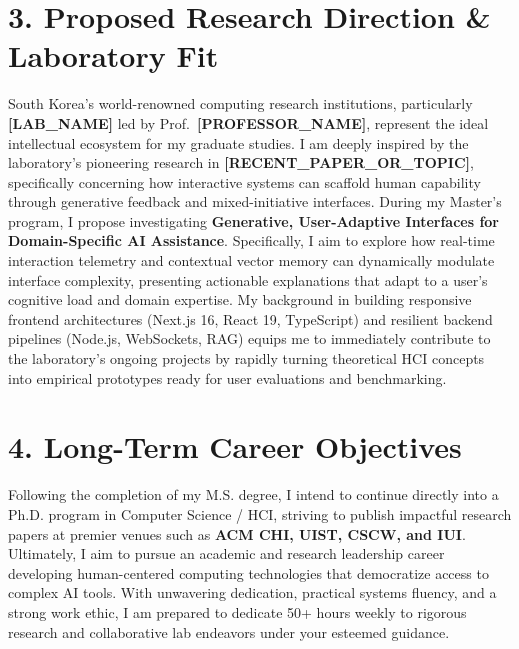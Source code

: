 \documentclass[10pt,a4paper]{article}
\begin{document}
\section{3. Proposed Research Direction \& Laboratory Fit}
South Korea's world-renowned computing research institutions, particularly \textbf{[LAB\_NAME]} led by Prof.~\textbf{[PROFESSOR\_NAME]}, represent the ideal intellectual ecosystem for my graduate studies. I am deeply inspired by the laboratory's pioneering research in \textbf{[RECENT\_PAPER\_OR\_TOPIC]}, specifically concerning how interactive systems can scaffold human capability through generative feedback and mixed-initiative interfaces. During my Master's program, I propose investigating \textbf{Generative, User-Adaptive Interfaces for Domain-Specific AI Assistance}. Specifically, I aim to explore how real-time interaction telemetry and contextual vector memory can dynamically modulate interface complexity, presenting actionable explanations that adapt to a user's cognitive load and domain expertise. My background in building responsive frontend architectures (Next.js 16, React 19, TypeScript) and resilient backend pipelines (Node.js, WebSockets, RAG) equips me to immediately contribute to the laboratory's ongoing projects by rapidly turning theoretical HCI concepts into empirical prototypes ready for user evaluations and benchmarking.

\section{4. Long-Term Career Objectives}
Following the completion of my M.S. degree, I intend to continue directly into a Ph.D. program in Computer Science / HCI, striving to publish impactful research papers at premier venues such as \textbf{ACM CHI, UIST, CSCW, and IUI}. Ultimately, I aim to pursue an academic and research leadership career developing human-centered computing technologies that democratize access to complex AI tools. With unwavering dedication, practical systems fluency, and a strong work ethic, I am prepared to dedicate 50+ hours weekly to rigorous research and collaborative lab endeavors under your esteemed guidance.
\end{document}
